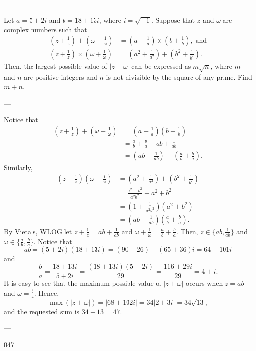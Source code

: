 
---

Let $a=5+2i$ and $b=18+13i$, where $i=\sqrt{-1}$. Suppose that $z$ and $\omega$ are complex numbers such that
\begin{align*}
    \left(z+\frac1z\right)+\left(\omega+\frac1\omega\right)&=\left(a+\frac1a\right)\times\left(b+\frac1b\right),\text{ and}\\
    \left(z+\frac1z\right)\times\left(\omega+\frac1\omega\right)&=\left(a^2+\frac1{a^2}\right)+\left(b^2+\frac1{b^2}\right).
\end{align*}
Then, the largest possible value of $|z+\omega|$ can be expressed as $m\sqrt n$, where $m$ and $n$ are positive integers and $n$ is not divisible by the square of any prime. Find $m+n$.

---

Notice that
\begin{align*}
    \left(z+\frac1z\right)+\left(\omega+\frac1\omega\right)&=\left(a+\frac1a\right)\left(b+\frac1b\right)\\
    &=\frac ab+\frac ba+ab+\frac1{ab}\\
    &=\left(ab+\frac1{ab}\right)+\left(\frac ab+\frac ba\right).
\end{align*}
Similarly,
\begin{align*}
    \left(z+\frac1z\right)\left(\omega+\frac1\omega\right)&=\left(a^2+\frac1{a^2}\right)+\left(b^2+\frac1{b^2}\right)\\
    &=\frac{a^2+b^2}{a^2b^2}+a^2+b^2\\
    &=\left(1+\frac1{a^2b^2}\right)(a^2+b^2)\\
    &=\left(ab+\frac1{ab}\right)\left(\frac ab+\frac ba\right).
\end{align*}
By Vieta's, WLOG let $z+\tfrac1z=ab+\tfrac1{ab}$ and $\omega+\tfrac1{\omega}=\tfrac ab+\tfrac ba$. Then, $z\in\{ab,\tfrac1{ab}\}$ and $\omega\in\{\tfrac ab,\tfrac ba\}$. Notice that \[ab=(5+2i)(18+13i)=(90-26)+(65+36)i=64+101i\]and \[\frac ba=\frac{18+13i}{5+2i}=\frac{(18+13i)(5-2i)}{29}=\frac{116+29i}{29}=4+i.\]It is easy to see that the maximum possible value of $|z+\omega|$ occurs when $z=ab$ and $\omega=\tfrac ba$. Hence, \[\max(|z+\omega|)=\left|68+102i\right|=34\left|2+3i\right|=34\sqrt{13},\]and the requested sum is $34+13=47$.

---

047
